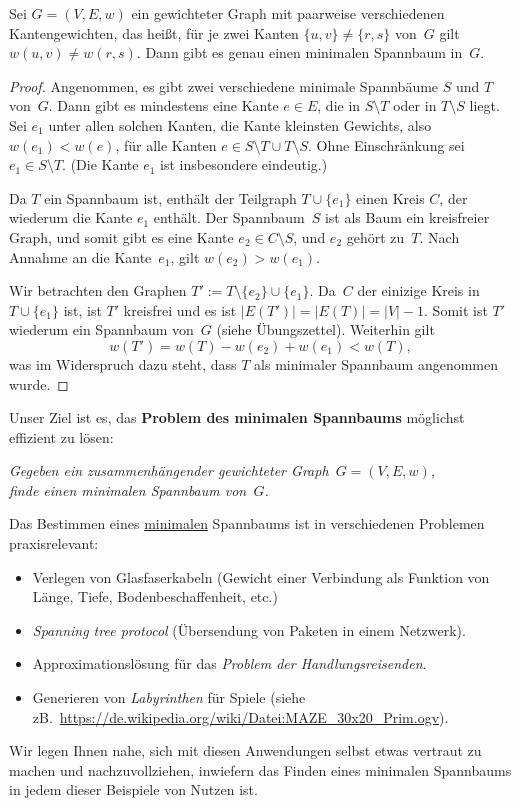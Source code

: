 \begin{prop}
Sei $G=(V,E,w)$ ein gewichteter Graph mit paarweise verschiedenen Kantengewichten, das hei\ss t, für je zwei Kanten $\{u,v\} \neq \{r,s\}$ von~$G$ gilt $w(u,v) \neq w(r,s)$.
Dann gibt es genau einen minimalen Spannbaum in~$G$.
\end{prop}
\begin{proof}
Angenommen, es gibt zwei verschiedene minimale Spannbäume $S$ und $T$ von~$G$.
Dann gibt es mindestens eine Kante $e \in E$, die in $S \setminus T$ oder in $T \setminus S$ liegt.
Sei $e_1$ unter allen solchen Kanten, die Kante kleinsten Gewichts, also $w(e_1) < w(e)$, für alle Kanten $e \in S \setminus T \cup T \setminus S$.
Ohne Einschränkung sei $e_1 \in S \setminus T$. (Die Kante $e_1$ ist insbesondere eindeutig.)

Da $T$ ein Spannbaum ist, enthält der Teilgraph $T \cup \{e_1\}$ einen Kreis $C$, der wiederum die Kante $e_1$ enthält.
Der Spannbaum~$S$ ist als Baum ein kreisfreier Graph, und somit gibt es eine Kante $e_2 \in C \setminus S$, und $e_2$ gehört zu~$T$.
Nach Annahme an die Kante~$e_1$, gilt $w(e_2) > w(e_1)$.

\condclearpage

Wir betrachten den Graphen $T' := T \setminus \{e_2\} \cup \{e_1\}$.
Da~$C$ der einizige Kreis in $T \cup \{e_1\}$ ist, ist $T'$ kreisfrei und es ist $|E(T')| = |E(T)| = |V|-1$.
Somit ist $T'$ wiederum ein Spannbaum von~$G$ (siehe Übungszettel).
Weiterhin gilt
\[
w(T') = w(T) - w(e_2) + w(e_1) < w(T),
\]
was im Widerspruch dazu steht, dass $T$ als minimaler Spannbaum angenommen wurde.
\end{proof}

\begin{bem} 
Unser Ziel ist es, das \textbf{Problem des minimalen Spannbaums} möglichst effizient zu lösen:
\begin{center}
\textit{Gegeben ein zusammenhängender gewichteter Graph~$G=(V,E,w)$,\\ finde einen minimalen Spannbaum von~$G$.}
\end{center}
%
\noindent Das Bestimmen eines \underline{minimalen} Spannbaums ist in verschiedenen Problemen praxisrelevant:
%
\begin{itemize}
 \item Verlegen von Glasfaserkabeln (Gewicht einer Verbindung als Funktion von Länge, Tiefe, Bodenbeschaffenheit, etc.)
 \item \emph{Spanning tree protocol} (Übersendung von Paketen in einem Netzwerk).
 \item Approximationslösung für das \emph{Problem der Handlungsreisenden}.
 \item Generieren von \emph{Labyrinthen} für Spiele (siehe zB.~\url{https://de.wikipedia.org/wiki/Datei:MAZE_30x20_Prim.ogv}).
\end{itemize}
Wir legen Ihnen nahe, sich mit diesen Anwendungen selbst etwas vertraut zu machen und nachzuvollziehen, inwiefern das Finden eines minimalen Spannbaums in jedem dieser Beispiele von Nutzen ist.
\end{bem} 

